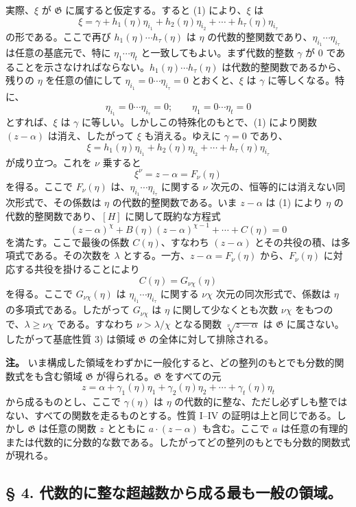 \documentclass[11pt]{article}
\begin{document}
実際、$\xi$ が $\mathfrak G$ に属すると仮定する。すると (1) により、$\xi$ は
\[
 \xi=\gamma+h_1(\eta)\eta_{i_1}+h_2(\eta)\eta_{i_2}
      +\cdots+h_\tau(\eta)\eta_{i_\tau}
\]
の形である。ここで再び $h_1(\eta)\cdots h_\tau(\eta)$ は $\eta$ の代数的整関数であり、$\eta_{i_1}\cdots\eta_{i_\tau}$ は任意の基底元で、特に $\eta_1\cdots\eta_t$ と一致してもよい。まず代数的整数 $\gamma$ が 0 であることを示さなければならない。$h_1(\eta)\cdots h_\tau(\eta)$ は代数的整関数であるから、残りの $\eta$ を任意の値にして $\eta_{i_1}=0\cdots\eta_{i_\tau}=0$ とおくと、$\xi$ は $\gamma$ に等しくなる。特に、
\[
 \eta_{i_1}=0\cdots \eta_{i_\tau}=0; \qquad
 \eta_1=0\cdots \eta_t=0
\]
とすれば、$\xi$ は $\gamma$ に等しい。しかしこの特殊化のもとで、(1) により関数 $(z-\alpha)$ は消え、したがって $\xi$ も消える。ゆえに $\gamma=0$ であり、
\[
 \xi=h_1(\eta)\eta_{i_1}+h_2(\eta)\eta_{i_2}
      +\cdots+h_\tau(\eta)\eta_{i_\tau}
\]
が成り立つ。これを $\nu$ 乗すると
\[
 \xi^\nu=z-\alpha=F_\nu(\eta)
\]
を得る。ここで $F_\nu(\eta)$ は、$\eta_{i_1}\cdots\eta_{i_\tau}$ に関する $\nu$ 次元の、恒等的には消えない同次形式で、その係数は $\eta$ の代数的整関数である。いま $z-\alpha$ は (1) により $\eta$ の代数的整関数であり、$[H]$ に関して既約な方程式
\[
 (z-\alpha)^\chi+B(\eta)(z-\alpha)^{\chi-1}+\cdots+C(\eta)=0
\]
を満たす。ここで最後の係数 $C(\eta)$、すなわち $(z-\alpha)$ とその共役の積、は多項式である。その次数を $\lambda$ とする。一方、$z-\alpha=F_\nu(\eta)$ から、$F_\nu(\eta)$ に対応する共役を掛けることにより
\[
 C(\eta)=G_{\nu\chi}(\eta)
\]
を得る。ここで $G_{\nu\chi}(\eta)$ は $\eta_{i_1}\cdots\eta_{i_\tau}$ に関する $\nu\chi$ 次元の同次形式で、係数は $\eta$ の多項式である。したがって $G_{\nu\chi}$ は $\eta$ に関して少なくとも次数 $\nu\chi$ をもつので、$\lambda\geq\nu\chi$ である。すなわち $\nu>\lambda/\chi$ となる関数 $\sqrt[\nu]{z-\alpha}$ は $\mathfrak G$ に属さない。したがって基底性質 3) は領域 $\mathfrak G$ の全体に対して排除される。

\textbf{注。} いま構成した領域をわずかに一般化すると、どの整列のもとでも分数的関数式をも含む領域 $\mathfrak G$ が得られる。$\mathfrak G$ をすべての元
\[
 z=\alpha+\gamma_1(\eta)\eta_1+\gamma_2(\eta)\eta_2
      +\cdots+\gamma_t(\eta)\eta_t
\]
から成るものとし、ここで $\gamma(\eta)$ は $\eta$ の代数的に整な、ただし必ずしも整ではない、すべての関数を走るものとする。性質 I--IV の証明は上と同じである。しかし $\mathfrak G$ は任意の関数 $z$ とともに $a\cdot(z-\alpha)$ も含む。ここで $a$ は任意の有理的または代数的に分数的な数である。したがってどの整列のもとでも分数的関数式が現れる。

\subsection*{§ 4. 代数的に整な超越数から成る最も一般の領域。}
\end{document}
